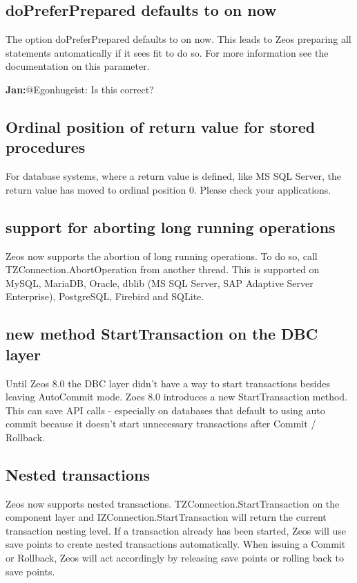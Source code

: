 \documentclass[a4paper,12pt,oneside]{article}
\begin{document}
\subsection{doPreferPrepared defaults to on now}
The option doPreferPrepared defaults to on now.
This leads to Zeos preparing all statements automatically if it sees fit to do so.
For more information see the documentation on this parameter.

\textbf{Jan:}@Egonhugeist: Is this correct?

\subsection{Ordinal position of return value for stored procedures}
For database systems, where a return value is defined, like MS SQL Server, the return value has moved to ordinal position 0.
Please check your applications.

\subsection{support for aborting long running operations}
Zeos now supports the abortion of long running operations.
To do so, call TZConnection.AbortOperation from another thread.
This is supported on MySQL, MariaDB, Oracle, dblib (MS SQL Server, SAP Adaptive Server Enterprise), PostgreSQL, Firebird and SQLite.

\subsection{new method StartTransaction on the DBC layer}
Until Zeos 8.0 the DBC layer didn't have a way to start transactions besides leaving AutoCommit mode.
Zoes 8.0 introduces a new StartTransaction method.
This can save API calls - especially on databases that default to using auto commit because it doesn't start unnecessary transactions after Commit / Rollback.

\subsection{Nested transactions}
Zeos now supports nested transactions. TZConnection.StartTransaction on the component layer and IZConnection.StartTransaction will return the current transaction nesting level.
If a transaction already has been started, Zeos will use save points to create nested transactions automatically.
When issuing a Commit or Rollback, Zeos will act accordingly by releasing save points or rolling back to save points.
\end{document}
